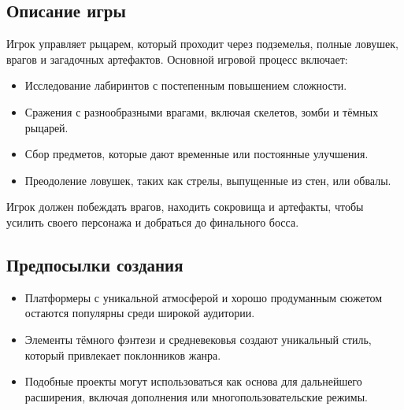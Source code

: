 \documentclass{article}
\begin{document}
\subsection{Описание игры}
Игрок управляет рыцарем, который проходит через подземелья, полные ловушек, врагов и загадочных артефактов. Основной игровой процесс включает:
\begin{itemize}
    \item Исследование лабиринтов с постепенным повышением сложности.
    \item Сражения с разнообразными врагами, включая скелетов, зомби и тёмных рыцарей.
    \item Сбор предметов, которые дают временные или постоянные улучшения.
    \item Преодоление ловушек, таких как стрелы, выпущенные из стен, или обвалы.
\end{itemize}
Игрок должен побеждать врагов, находить сокровища и артефакты, чтобы усилить своего персонажа и добраться до финального босса.

\subsection{Предпосылки создания}
\begin{itemize}
    \item Платформеры с уникальной атмосферой и хорошо продуманным сюжетом остаются популярны среди широкой аудитории.
    \item Элементы тёмного фэнтези и средневековья создают уникальный стиль, который привлекает поклонников жанра.
    \item Подобные проекты могут использоваться как основа для дальнейшего расширения, включая дополнения или многопользовательские режимы.
\end{itemize}
\end{document}
